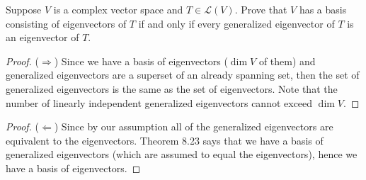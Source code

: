 Suppose $V$ is a complex vector space and $T \in \mathcal{L}(V)$.  Prove that $V$ has a basis consisting of eigenvectors of $T$ if and only if every generalized eigenvector of $T$ is an eigenvector of $T$.

\begin{proof} ($\Longrightarrow$)
    Since we have a basis of eigenvectors ($\dim V$ of them) and generalized eigenvectors are a superset of an already spanning set, then the set of generalized eigenvectors is the same as the set of eigenvectors. Note that the number of linearly independent generalized eigenvectors cannot exceed $\dim V$.
\end{proof}

\begin{proof} ($\Longleftarrow$)
    Since by our assumption all of the generalized eigenvectors are equivalent to the eigenvectors. Theorem 8.23 says that we have a basis of generalized eigenvectors (which are assumed to equal the eigenvectors), hence we have a basis of eigenvectors.
\end{proof}
